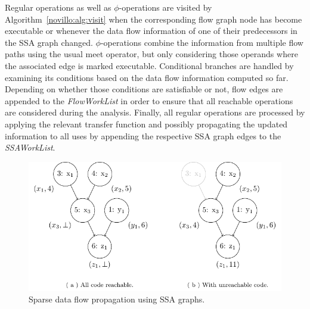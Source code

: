 Regular operations as well as $\phi$-operations are visited by
Algorithm~\ref{novillo:alg:visit} when the corresponding flow graph node has
become executable or whenever the data flow information of one of their
predecessors in the SSA graph changed. $\phi$-operations combine the information
from multiple flow paths using the usual meet operator, but only considering
those operands where the associated edge is marked executable. Conditional
branches are handled by examining its conditions based on the data flow
information computed so far. Depending on whether those conditions are
satisfiable or not, flow edges are appended to the \emph{FlowWorkList} in order
to ensure that all reachable operations are considered during the analysis.
Finally, all regular operations are processed by applying the relevant transfer
function and possibly propagating the updated information to all uses by
appending the respective SSA graph edges to the \emph{SSAWorkList}.

\begin{figure}[t!]
  \begin{center}
    \includegraphics{ssa_propagation}
    \subfloat{\label{novillo:fig:ssa_propagation:a}}
    \subfloat{\label{novillo:fig:ssa_propagation:b}}
  \end{center}
  \vspace{-2em}
  \caption{Sparse data flow propagation using SSA graphs.}
  \label{novillo:fig:ssa_propagation}
\end{figure}

